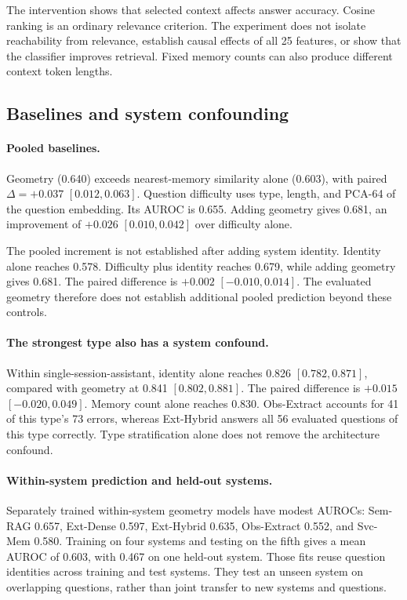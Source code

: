 \documentclass{article}
\begin{document}
The intervention shows that selected context affects answer accuracy.
Cosine ranking is an ordinary relevance criterion.
The experiment does not isolate reachability from relevance, establish causal
effects of all 25 features, or show that the classifier improves retrieval.
Fixed memory counts can also produce different context token lengths.

\subsection{Baselines and system confounding}
\label{sec:general}

\paragraph{Pooled baselines.}
Geometry (0.640) exceeds nearest-memory similarity alone (0.603),
with paired $\Delta=+0.037$ $[0.012,0.063]$.
Question difficulty uses type, length, and PCA-64 of the question embedding.
Its AUROC is 0.655. Adding geometry gives 0.681, an improvement of
$+0.026$ $[0.010,0.042]$ over difficulty alone.

The pooled increment is not established after adding system identity.
Identity alone reaches 0.578.
Difficulty plus identity reaches 0.679, while adding geometry gives 0.681.
The paired difference is $+0.002$ $[-0.010,0.014]$.
The evaluated geometry therefore does not establish additional pooled
prediction beyond these controls.

\paragraph{The strongest type also has a system confound.}
Within single-session-assistant, identity alone reaches 0.826
$[0.782,0.871]$, compared with geometry at 0.841 $[0.802,0.881]$.
The paired difference is $+0.015$ $[-0.020,0.049]$.
Memory count alone reaches 0.830.
Obs-Extract accounts for 41 of this type's 73 errors,
whereas Ext-Hybrid answers all 56 evaluated questions of this type correctly.
Type stratification alone does not remove the architecture confound.

\paragraph{Within-system prediction and held-out systems.}
Separately trained within-system geometry models have modest AUROCs:
Sem-RAG 0.657, Ext-Dense 0.597, Ext-Hybrid 0.635,
Obs-Extract 0.552, and Svc-Mem 0.580.
Training on four systems and testing on the fifth gives a mean AUROC of 0.603,
with 0.467 on one held-out system.
Those fits reuse question identities across training and test systems.
They test an unseen system on overlapping questions, rather than joint
transfer to new systems and questions.
\end{document}
